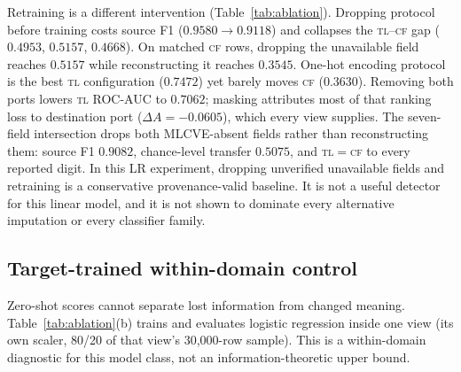 \documentclass[conference,a4paper]{IEEEtran}
\begin{document}
Retraining is a different intervention (Table~\ref{tab:ablation}). Dropping protocol before training costs source F1 ($0.9580\rightarrow0.9118$) and collapses the \textsc{tl}--\textsc{cf} gap ($0.4953$, $0.5157$, $0.4668$). On matched \textsc{cf} rows, dropping the unavailable field reaches $0.5157$ while reconstructing it reaches $0.3545$. One-hot encoding protocol is the best \textsc{tl} configuration ($0.7472$) yet barely moves \textsc{cf} ($0.3630$). Removing both ports lowers \textsc{tl} ROC-AUC to $0.7062$; masking attributes most of that ranking loss to destination port ($\Delta A=-0.0605$), which every view supplies. The seven-field intersection drops both MLCVE-absent fields rather than reconstructing them: source F1 $0.9082$, chance-level transfer $0.5075$, and \textsc{tl}$=$\textsc{cf} to every reported digit. In this LR experiment, dropping unverified unavailable fields and retraining is a conservative provenance-valid baseline. It is not a useful detector for this linear model, and it is not shown to dominate every alternative imputation or every classifier family.

\subsection{Target-trained within-domain control}\label{sec:oracle}
Zero-shot scores cannot separate lost information from changed meaning. Table~\ref{tab:ablation}(b) trains and evaluates logistic regression inside one view (its own scaler, 80/20 of that view's 30,000-row sample). This is a within-domain diagnostic for this model class, not an information-theoretic upper bound.
\end{document}
